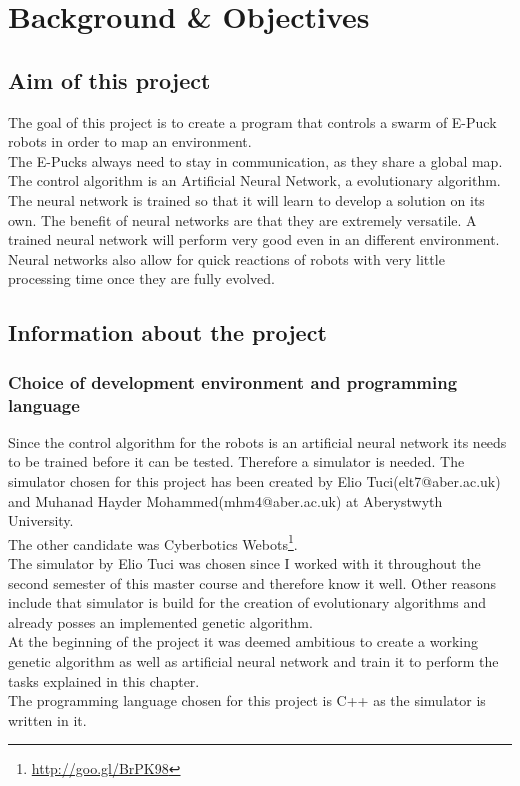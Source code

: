 \chapter{Background \& Objectives}

\section{Aim of this project}
The goal of this project is to create a program that controls a swarm of E-Puck robots in order to map an environment. \\
The E-Pucks always need to stay in communication, as they share a global map. \\
The control algorithm is an Artificial Neural Network, a evolutionary algorithm. \\
The neural network is trained so that it will learn to develop a solution on its own.
The benefit of neural networks are that they are extremely versatile. A trained neural network will perform very good even in an different environment. Neural networks also allow for quick reactions of robots with very little processing time once they are fully evolved.  

\section{Information about the project}
\subsection{Choice of development environment and programming language}
Since the control algorithm for the robots is an artificial neural network its needs to be trained before it can be tested. Therefore a simulator is needed.
The simulator chosen for this project has been created by Elio Tuci(elt7@aber.ac.uk) and Muhanad Hayder Mohammed(mhm4@aber.ac.uk) at Aberystwyth University. \\
The other candidate was Cyberbotics Webots\footnote{\url{http://goo.gl/BrPK98}}. \\
The simulator by Elio Tuci was chosen since I worked with it throughout the second semester of this master course and therefore know it well. Other reasons include that simulator is build for the creation of evolutionary algorithms and already posses an implemented genetic algorithm. \\
At the beginning of the project it was deemed ambitious to create a working genetic algorithm as well as artificial neural network and train it to perform the tasks explained in this chapter. \\
The programming language chosen for this project is C++ as the simulator is written in it. 

